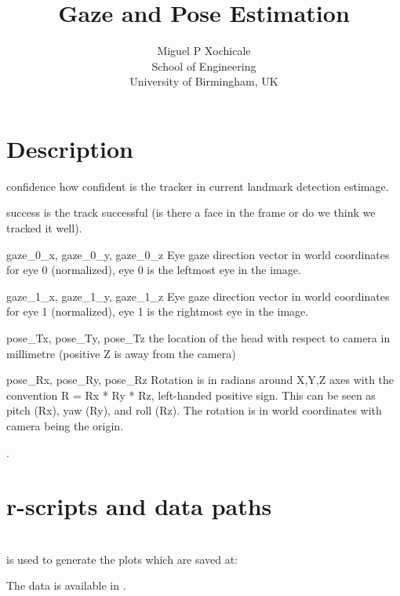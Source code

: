 \documentclass[a4paper,12pt]{article}
\title{Gaze and Pose Estimation}
\author{Miguel P Xochicale \\
School of Engineering\\
University of Birmingham, UK}
\begin{document}
\maketitle

%


\section{Description}


confidence how confident is the tracker in current landmark detection estimage.

success is the track successful (is there a face in the frame or do we think we tracked it well).

gaze\_0\_x, gaze\_0\_y, gaze\_0\_z Eye gaze direction vector in world coordinates for eye 0 (normalized), eye 0 is the leftmost eye in the image.

gaze\_1\_x, gaze\_1\_y, gaze\_1\_z Eye gaze direction vector in world coordinates for eye 1 (normalized), eye 1 is the rightmost eye in the image.


pose\_Tx, pose\_Ty, pose\_Tz the location of the head with respect to camera in millimetre (positive Z is away from the camera)

pose\_Rx, pose\_Ry, pose\_Rz Rotation is in radians around X,Y,Z axes with the convention R = Rx * Ry * Rz, left-handed positive sign. This can be seen as pitch (Rx), yaw (Ry), and roll (Rz). The rotation is in world coordinates with camera being the origin.

\cite{baltrusaitis2016}.


\section{r-scripts and data paths}
 \\
is used to generate the plots which are saved at: \\



The data is available in \cite{mxochicale2018}.






\end{document}
